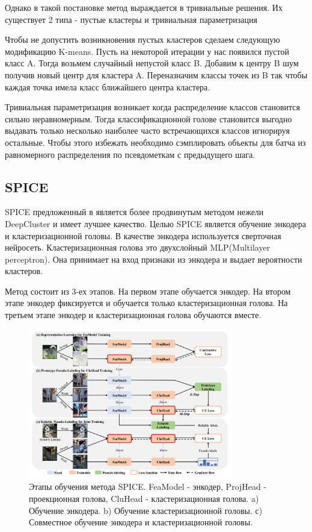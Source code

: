 \documentclass[a4paper,12pt]{extarticle}
\begin{document}
Однако в такой постановке метод выраждается в тривиальные 
решения. Их существует 2 типа - пустые кластеры и 
тривиальная параметризация

Чтобы не допустить возникновения пустых кластеров 
сделаем следующую модификацию K-means. Пусть 
на некоторой итерации у нас появился пустой 
класс A. Тогда возьмем случайный непустой класс 
B. Добавим к центру B шум получив новый центр 
для кластера A. Переназначим классы точек из B 
так чтобы каждая точка имела класс ближайшего 
центра кластера. 

Тривиальная параметризация возникает когда 
распределение классов становится сильно неравномерным. 
Тогда классификационной голове становится выгодно выдавать 
только несколько наиболее часто встречающихся классов игнорируя остальные. 
Чтобы этого избежать необходимо сэмплировать объекты для батча 
из равномерного распределения по псевдометкам с предыдущего шага.

\subsection{SPICE}

SPICE предложенный в \cite{niu2021spice} является более 
продвинутым методом нежели DeepCluster и имеет лучшее качество.
Целью SPICE является обучение энкодера и кластеризационной головы. 
В качестве энкодера используется сверточная нейросеть.
Кластеризационная голова это двухслойный MLP(Multilayer perceptron). 
Она принимает на вход признаки из энкодера и выдает вероятности 
кластеров.

Метод состоит из 3-ех этапов. На первом этапе обучается энкодер.
На втором этапе энкодер фиксируется и обучается только кластеризационная
голова. На третьем этапе энкодер и кластеризационная голова обучаются 
вместе. 

\begin{figure}[ht]
	\centering
	\includegraphics[width=0.8\textwidth]{spice.png}
	\caption{Этапы обучения метода SPICE. 
	FeaModel - энкодер, ProjHead - проекционная голова, CluHead - кластеризационная голова. a) Обучение энкодера. b) Обучение кластеризационной головы.
	с) Совместное обучение энкодера и кластеризационной головы. }
	\label{fig:spice}
\end{figure}
\end{document}
